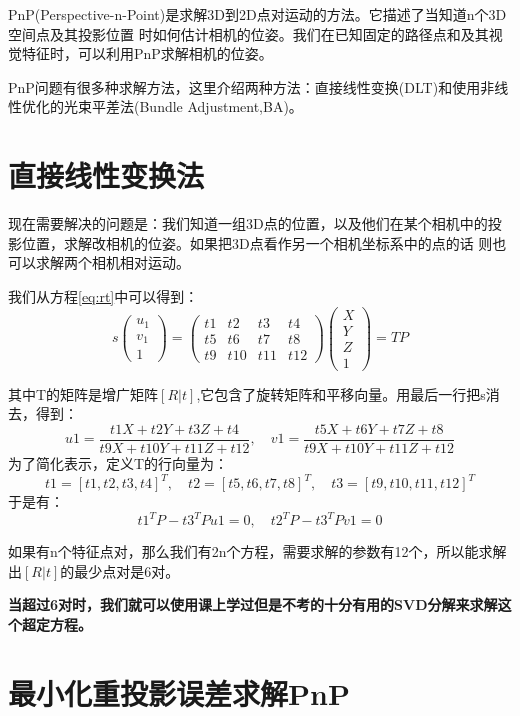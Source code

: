PnP(Perspective-n-Point)是求解3D到2D点对运动的方法。它描述了当知道n个3D空间点及其投影位置
时如何估计相机的位姿。我们在已知固定的路径点和及其视觉特征时，可以利用PnP求解相机的位姿。

PnP问题有很多种求解方法，这里介绍两种方法：直接线性变换(DLT)和使用非线性优化的光束平差法(Bundle Adjustment,BA)。

\section{直接线性变换法}

现在需要解决的问题是：我们知道一组3D点的位置，以及他们在某个相机中的投影位置，求解改相机的位姿。如果把3D点看作另一个相机坐标系中的点的话
则也可以求解两个相机相对运动。

我们从方程\ref{eq:rt}中可以得到：
\begin{equation}
    s \begin{pmatrix}
        u_1 \\ v_1 \\ 1
    \end{pmatrix}
    =
    \begin{pmatrix}
        t1 & t2 & t3 & t4 \\
        t5 & t6 & t7 & t8 \\
        t9 & t10 & t11 & t12 
    \end{pmatrix}
    \begin{pmatrix}
        X \\ Y \\ Z \\ 1
    \end{pmatrix} = T P
\end{equation}

其中T的矩阵是增广矩阵$[R|t]$,它包含了旋转矩阵和平移向量。用最后一行把s消去，得到：
\[
u1 = \frac{t1X + t2Y + t3Z + t4}{t9X + t10Y + t11Z + t12},\quad v1 = \frac{t5X + t6Y + t7Z + t8}{t9X + t10Y + t11Z + t12}
\]
为了简化表示，定义T的行向量为：
\[
t1 = [t1,t2,t3,t4]^T,\quad t2 = [t5,t6,t7,t8]^T,\quad t3 = [t9,t10,t11,t12]^T
\]
于是有：
\[
t1^T P  - t3^T P u1 =0,\quad t2^T P - t3^T P v1 =0
\]

如果有n个特征点对，那么我们有2n个方程，需要求解的参数有12个，所以能求解出$[R|t]$的最少点对是6对。

\textbf{当超过6对时，我们就可以使用课上学过但是不考的十分有用的SVD分解来求解这个超定方程。}

\section{最小化重投影误差求解PnP}

